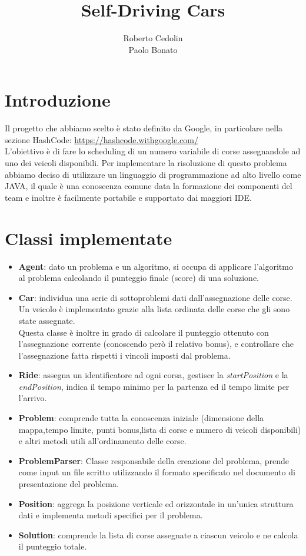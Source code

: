 \documentclass[11pt,a4paper]{article}
\begin{document}
\title{Self-Driving Cars}
\author[1]{Roberto Cedolin\\Paolo Bonato}
\maketitle
\section{Introduzione}
Il progetto che abbiamo scelto è stato definito da Google, in particolare nella sezione HashCode: \url{https://hashcode.withgoogle.com/}\\
L’obiettivo è di fare lo scheduling di un numero variabile di corse assegnandole ad uno dei veicoli disponibili.
Per implementare la risoluzione di questo problema abbiamo deciso di utilizzare un linguaggio di programmazione ad alto livello come JAVA, il quale è una conoscenza comune data la formazione dei componenti del team e inoltre è facilmente portabile e supportato dai maggiori IDE.
\section{Classi implementate}
\begin{itemize}
	\item \textbf{Agent}: dato un problema e un algoritmo, si occupa di applicare l’algoritmo al problema calcolando il punteggio finale (score) di una soluzione.
	\item \textbf{Car}: individua una serie di sottoproblemi dati dall'assegnazione delle corse. Un veicolo è implementato grazie alla lista ordinata delle corse che gli sono state assegnate. \\
	Questa classe è inoltre in grado di calcolare il punteggio ottenuto con l'assegnazione corrente (conoscendo però il relativo bonus), e controllare che l'assegnazione fatta rispetti i vincoli imposti dal problema.
	\item \textbf{Ride}: assegna un identificatore ad ogni corsa, gestisce la \textit{startPosition} e la \textit{endPosition}, indica il tempo minimo per la partenza ed il tempo limite per l'arrivo.
	\item \textbf{Problem}: comprende tutta la conoscenza iniziale (dimensione della mappa,tempo limite, punti bonus,lista di corse e numero di veicoli disponibili) e altri metodi utili all’ordinamento delle corse.
	\item \textbf{ProblemParser}: Classe responsabile della creazione del problema, prende come input un file scritto utilizzando il formato specificato nel documento di presentazione del problema.
	\item \textbf{Position}: aggrega la posizione verticale ed orizzontale in un'unica struttura dati e implementa metodi specifici per il problema.
	\item \textbf{Solution}: comprende la lista di corse assegnate a ciascun veicolo e ne calcola il punteggio totale.
\end{itemize}
\end{document}
